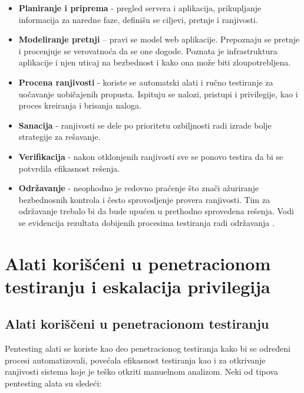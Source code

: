 \documentclass[a4paper,12pt]{article}
\begin{document}
\begin{itemize}
    \item \textbf{Planiranje i priprema} - pregled servera i aplikacija, prikupljanje informacija za naredne faze, definišu se ciljevi, pretnje i ranjivosti. 

    \item \textbf{Modeliranje pretnji} – pravi se model web aplikacije. Prepoznaju se pretnje i procenjuje se verovatnoća da se one dogode. Poznata je infrastruktura aplikacije i njen uticaj na bezbednost i kako ona može biti zloupotrebljena.

    \item \textbf{Procena ranjivosti} - koriste se automatski alati i ručno testiranje za uočavanje uobičajenih propusta. Ispituju se nalozi, pristupi i privilegije, kao i proces kreiranja i brisanja naloga.

    \item \textbf{Sanacija} - ranjivosti se dele po prioritetu ozbiljnosti radi izrade bolje strategije za rešavanje. 

    \item \textbf{Verifikacija} - nakon otklonjenih ranjivosti sve se ponovo testira da bi se potvrdila efikasnost rešenja. 
    
    \item \textbf{Održavanje} - neophodno je redovno praćenje što znači ažuriranje bezbednosnih kontrola i često sprovodjenje provera ranjivosti. Tim za održavanje trebalo bi da bude upućen u prethodno sprovedena rešenja. Vodi se evidencija rezultata dobijenih procesima testiranja radi održavanja \cite{owasp}. 
\end{itemize}

\section{Alati korišćeni u penetracionom testiranju i eskalacija privilegija}
\subsection{Alati koriščeni u penetracionom testiranju}
Pentesting alati se koriste kao deo penetracionog testiranja kako bi se određeni procesi automatizovali, povećala efikasnost testiranja kao i za otkrivanje ranjivosti sistema koje je teško otkriti manuelnom analizom. Neki od tipova pentesting alata su sledeći:
\end{document}
